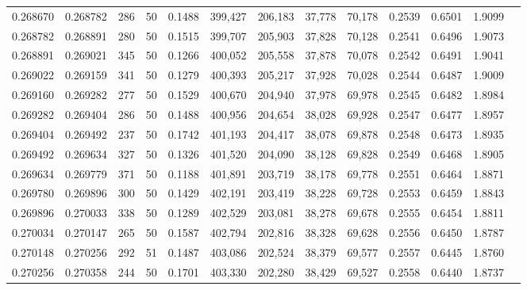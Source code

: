 \begin{tabular}{rrrrrrrrrrrrr}
0.268670 & 0.268782 &   286 &  50 &                                     0.1488 & 399,427 & 206,183 &  37,778 &  70,178 & 0.2539 & 0.6501 & 1.9099 \\
0.268782 & 0.268891 &   280 &  50 &                                     0.1515 & 399,707 & 205,903 &  37,828 &  70,128 & 0.2541 & 0.6496 & 1.9073 \\
0.268891 & 0.269021 &   345 &  50 &                                     0.1266 & 400,052 & 205,558 &  37,878 &  70,078 & 0.2542 & 0.6491 & 1.9041 \\
0.269022 & 0.269159 &   341 &  50 &                                     0.1279 & 400,393 & 205,217 &  37,928 &  70,028 & 0.2544 & 0.6487 & 1.9009 \\
0.269160 & 0.269282 &   277 &  50 &                                     0.1529 & 400,670 & 204,940 &  37,978 &  69,978 & 0.2545 & 0.6482 & 1.8984 \\
0.269282 & 0.269404 &   286 &  50 &                                     0.1488 & 400,956 & 204,654 &  38,028 &  69,928 & 0.2547 & 0.6477 & 1.8957 \\
0.269404 & 0.269492 &   237 &  50 &                                     0.1742 & 401,193 & 204,417 &  38,078 &  69,878 & 0.2548 & 0.6473 & 1.8935 \\
0.269492 & 0.269634 &   327 &  50 &                                     0.1326 & 401,520 & 204,090 &  38,128 &  69,828 & 0.2549 & 0.6468 & 1.8905 \\
0.269634 & 0.269779 &   371 &  50 &                                     0.1188 & 401,891 & 203,719 &  38,178 &  69,778 & 0.2551 & 0.6464 & 1.8871 \\
0.269780 & 0.269896 &   300 &  50 &                                     0.1429 & 402,191 & 203,419 &  38,228 &  69,728 & 0.2553 & 0.6459 & 1.8843 \\
0.269896 & 0.270033 &   338 &  50 &                                     0.1289 & 402,529 & 203,081 &  38,278 &  69,678 & 0.2555 & 0.6454 & 1.8811 \\
0.270034 & 0.270147 &   265 &  50 &                                     0.1587 & 402,794 & 202,816 &  38,328 &  69,628 & 0.2556 & 0.6450 & 1.8787 \\
0.270148 & 0.270256 &   292 &  51 &                                     0.1487 & 403,086 & 202,524 &  38,379 &  69,577 & 0.2557 & 0.6445 & 1.8760 \\
0.270256 & 0.270358 &   244 &  50 &                                     0.1701 & 403,330 & 202,280 &  38,429 &  69,527 & 0.2558 & 0.6440 & 1.8737 \\

\end{tabular}
